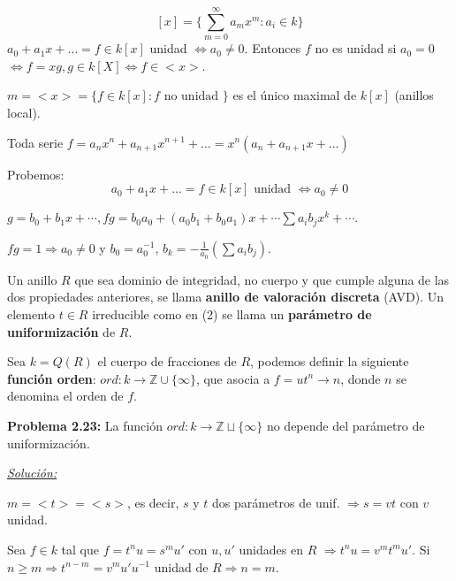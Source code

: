 \begin{itemize*}
\item $$[x]=\{\sum_{m=0}^\infty a_mx^m:a_i\in k \}$$
  $a_0+a_1x+\dots=f\in k[x]$ unidad $\Leftrightarrow a_0\neq 0$. Entonces $f$ no es unidad si $a_0=0$ $\Leftrightarrow f=xg,g\in k[X] \Leftrightarrow f\in <x>$.

$m=<x>=\{f\in k[x]: f \text{ no unidad } \} $ es el único maximal de $k[x]$ (anillos local).

Toda serie $f=a_nx^n+a_{n+1}x^{n+1}+\dots=x^n(a_n+a_{n+1}x+\dots)$

Probemos: 
$$a_0+a_1x+\dots=f\in k[x] \text{ unidad } \Leftrightarrow a_0\neq 0$$
\begin{Dem}
$g=b_0+b_1x+\cdots, fg=b_0a_0+(a_0b_1+b_0a_1)x+\cdots \sum a_ib_jx^k+\cdots$.

$fg=1 \Rightarrow a_0\neq 0$ y $b_0=a_0^{-1}$, $b_k=-\frac{1}{a_0}(\sum a_ib_j)$. 

\end{Dem}
\end{itemize*}


\begin{Def}
Un anillo $R$ que sea dominio de integridad, no cuerpo y que cumple alguna de las dos propiedades anteriores, se llama \textbf{anillo de valoración discreta} (AVD). Un elemento $t\in R$ irreducible como en (2) se llama un \textbf{parámetro de uniformización} de $R$.
\end{Def}

\begin{Def}
Sea $k=Q(R)$ el cuerpo de fracciones de $R$, podemos definir la siguiente \textbf{función orden}: $ord: k\rightarrow \mathbb{Z}\cup \{\infty \}$, que asocia a $f=ut^n \rightarrow n$, donde $n$ se denomina el orden de $f$.
\end{Def}

\textbf{Problema 2.23:} La función  $ord:k\rightarrow \mathbb{Z} \sqcup \{\infty \}$ no depende del parámetro de uniformización. 

\underline{\textit{Solución: }}

$m=<t>=<s>$, es decir, $s$ y $t$ dos parámetros de unif. $\Rightarrow s=vt$ con $v$ unidad.

Sea $f\in k$ tal que $f=t^nu=s^mu'$ con $u,u'$ unidades en $R$ $\Rightarrow t^nu=v^mt^mu'$. Si $n\ge m \Rightarrow t^{n-m}=v^mu'u^{-1}$
 unidad de $R \Rightarrow n=m$.


